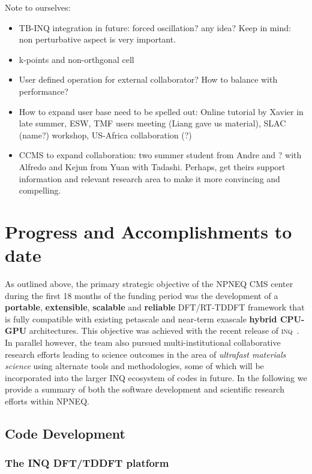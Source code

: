 {\color{green}
Note to ourselves:
\begin{itemize}
    \item TB-INQ integration in future: forced oscillation? any idea? Keep in mind: non perturbative aspect is very important.
    \item k-points and non-orthgonal cell
    \item User defined operation for external collaborator? How to balance with performance?
    \item How to expand user base need to be spelled out: Online tutorial by Xavier in late summer, ESW, TMF users meeting (Liang gave us material), SLAC (name?) workshop, US-Africa collaboration (?)
    \item CCMS to expand collaboration: two summer student from Andre and ? with Alfredo and Kejun from Yuan with Tadashi. Perhaps, get theirs support information and relevant research area to make it more convincing and compelling.
\end{itemize}

}
\clearpage

\section{Progress and Accomplishments to date}

As outlined above, the primary strategic objective of the NPNEQ CMS center during the first 18 months of the funding period was the development of a \textbf{portable}, \textbf{extensible}, \textbf{scalable} and \textbf{reliable} DFT/RT-TDDFT framework that is fully compatible with existing petascale and near-term exascale \textbf{hybrid CPU-GPU} architectures.
This objective was achieved with the recent release of \textsc{inq}~\cite{Andrade2021}. 
In parallel however, the team also pursued multi-institutional collaborative research efforts leading to science outcomes in the area of \emph{ultrafast materials science} using alternate tools and methodologies, some of which will be incorporated into the larger INQ ecosystem of codes in future. 
In the following we provide a summary of both the software development and scientific research efforts within NPNEQ.

\subsection{Code Development}

\subsubsection{The INQ DFT/TDDFT platform} 

